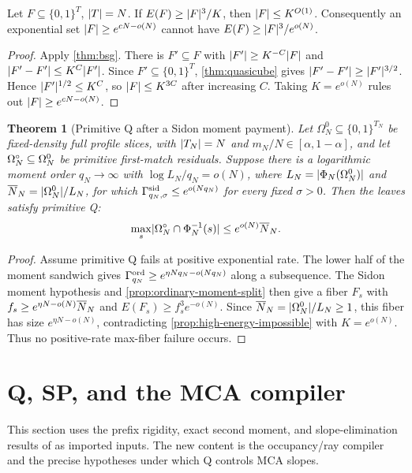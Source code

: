 \documentclass[11pt,a4paper]{amsart}
\numberwithin{equation}{section}
\newtheorem{theorem}{Theorem}[section]
\theoremstyle{remark}
\begin{document}
\begin{proposition}\label{prop:high-energy-impossible}
Let \(F\subseteq\{0,1\}^T\), \(\lvert T\rvert=N\).  If
\(E(F)\ge \lvert F\rvert^3/K\), then \(\lvert F\rvert\le K^{O(1)}\).  Consequently an
exponential set \(\lvert F\rvert\ge e^{cN-o(N)}\) cannot have
\(E(F)\ge\lvert F\rvert^3/e^{o(N)}\).
\end{proposition}

\begin{proof}
Apply \cref{thm:bsg}.  There is \(F'\subseteq F\) with \(\lvert F'\rvert\ge K^{-C}\lvert F\rvert\) and \(\lvert F'-F'\rvert\le K^C\lvert F'\rvert\).  Since \(F'\subseteq\{0,1\}^T\), \cref{thm:quasicube} gives \(\lvert F'-F'\rvert\ge \lvert F'\rvert^{3/2}\).  Hence \(\lvert F'\rvert^{1/2}\le K^C\), so \(\lvert F\rvert\le K^{3C}\) after increasing \(C\).  Taking \(K=e^{o(N)}\) rules out \(\lvert F\rvert\ge e^{cN-o(N)}\).
\end{proof}

\begin{theorem}[Primitive Q after a Sidon moment payment]\label{thm:primitive-q}
Let \(\Omega_N^0\subseteq\{0,1\}^{T_N}\) be fixed-density full profile
slices, with \(\lvert T_N\rvert=N\) and
\(m_N/N\in[\alpha,1-\alpha]\), and let
\(\Omega^{\circ}_N\subseteq\Omega_N^0\) be primitive first-match residuals.  Suppose
there is a logarithmic moment
order \(q_N\to\infty\) with
\(\log L_N/q_N=o(N)\), where
\(L_N=\lvert \Phi_N(\Omega_N^0)\rvert\) and
\(\overline N_N=\lvert \Omega_N^0\rvert/L_N\), for which
\(\Gamma^{\rm sid}_{q_N,\sigma}\le e^{o(Nq_N)}\) for every fixed \(\sigma>0\).
Then the leaves satisfy primitive Q:
\[
        \max_s\lvert \Omega^{\circ}_N\cap\Phi_N^{-1}(s)\rvert
        \le e^{o(N)}\overline N_N .
\]
\end{theorem}

\begin{proof}
Assume primitive Q fails at positive exponential rate.  The lower half of
the moment sandwich gives
\(\Gamma^{\rm ord}_{q_N}\ge e^{\eta Nq_N-o(Nq_N)}\) along a subsequence.  The Sidon
moment hypothesis and \cref{prop:ordinary-moment-split} then give a fiber
\(F_s\) with \(f_s\ge e^{\eta N-o(N)}\overline N_N\) and
\(E(F_s)\ge f_s^3e^{-o(N)}\).  Since
\(\overline N_N=\lvert \Omega_N^0\rvert/L_N\ge1\), this fiber has size
\(e^{\eta N-o(N)}\), contradicting
\cref{prop:high-energy-impossible} with \(K=e^{o(N)}\).  Thus no
positive-rate max-fiber failure occurs.
\end{proof}

\section{Q, SP, and the MCA compiler}\label{sec:compiler}
This section uses the prefix rigidity, exact second moment, and slope-elimination results of \cite[Secs.~19--21 and Apps.~E--F]{CAP25v132} as imported inputs.  The new content is the occupancy/ray compiler and the precise hypotheses under which Q controls MCA slopes.
\end{document}
